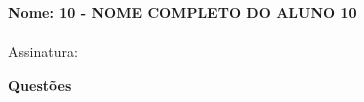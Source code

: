 \documentclass[addpoints,,12pt]{exam}
\begin{document}
	\begin{mdframed}[align=left]
		\textbf{Nome: 10 - NOME COMPLETO DO ALUNO 10}
		\\
		\\Assinatura:
	\end{mdframed}

	\newpage	
	
\noindent \textbf{Questões}

\begin{questions}










\end{questions}
\end{document}

